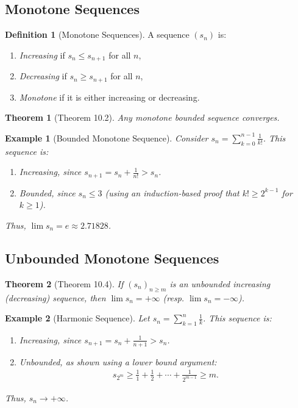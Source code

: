 \documentclass[9pt]{article}
\theoremstyle{definition}
\newtheorem{definition}{Definition}
\theoremstyle{plain}
\newtheorem{theorem}{Theorem}
\newtheorem{example}{Example}
\begin{document}
\subsection*{Monotone Sequences}
\begin{definition}[Monotone Sequences]
A sequence $ (s_n) $ is:
\begin{enumerate}
    \item \emph{Increasing} if $ s_n \leq s_{n+1} $ for all $ n $,
    \item \emph{Decreasing} if $ s_n \geq s_{n+1} $ for all $ n $,
    \item \emph{Monotone} if it is either increasing or decreasing.
\end{enumerate}
\end{definition}

\begin{theorem}[Theorem 10.2]
Any monotone bounded sequence converges.
\end{theorem}

\begin{example}[Bounded Monotone Sequence]
Consider $ s_n = \sum_{k=0}^{n-1} \frac{1}{k!} $. This sequence is:
\begin{enumerate}
    \item Increasing, since $ s_{n+1} = s_n + \frac{1}{n!} > s_n $.
    \item Bounded, since $ s_n \leq 3 $ (using an induction-based proof that $ k! \geq 2^{k-1} $ for $ k \geq 1 $).
\end{enumerate}
Thus, $ \lim s_n = e \approx 2.71828 $.
\end{example}

\subsection*{Unbounded Monotone Sequences}
\begin{theorem}[Theorem 10.4]
If $ (s_n)_{n \geq m} $ is an unbounded increasing (decreasing) sequence, then $ \lim s_n = +\infty $ (resp. $ \lim s_n = -\infty $).
\end{theorem}

\begin{example}[Harmonic Sequence]
Let $ s_n = \sum_{k=1}^n \frac{1}{k} $. This sequence is:
\begin{enumerate}
    \item Increasing, since $ s_{n+1} = s_n + \frac{1}{n+1} > s_n $.
    \item Unbounded, as shown using a lower bound argument:
    \begin{align}
    s_{2^m} \geq \frac{1}{1} + \frac{1}{2} + \cdots + \frac{1}{2^{m-1}} \geq m.
    \end{align}
\end{enumerate}
Thus, $ s_n \to +\infty $.
\end{example}
\end{document}
